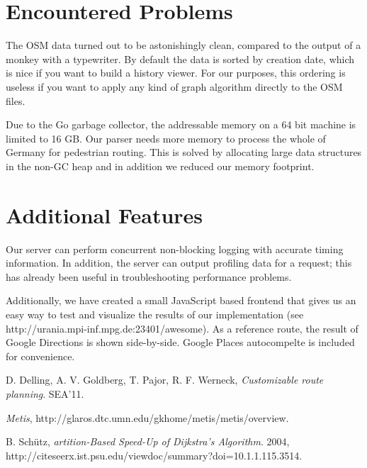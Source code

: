 \documentclass[a4paper]{article}
\begin{document}
\section{Encountered Problems}

The OSM data turned out to be astonishingly clean, compared to the output of a monkey with a typewriter.
By default the data is sorted by creation date, which is nice if you want to build a history viewer.
For our purposes, this ordering is useless if you want to apply any kind of graph algorithm
directly to the OSM files.

Due to the Go garbage collector, the addressable memory on a 64 bit machine is limited to 16 GB.
Our parser needs more memory to process the whole of Germany for pedestrian routing.
This is solved by allocating large data structures in the non-GC heap
and in addition we reduced our memory footprint.

\section{Additional Features}

Our server can perform concurrent non-blocking logging with accurate timing information.
In addition, the server can output profiling data for a request;
this has already been useful in troubleshooting performance problems.

Additionally, we have created a small JavaScript based frontend that 
gives us an easy way to test and visualize the results of our implementation
(see http://urania.mpi-inf.mpg.de:23401/awesome).
As a reference route, the result of Google Directions is shown side-by-side.
Google Places autocompelte is included for convenience.

\begin{thebibliography}{9}
  
	D. Delling, A. V. Goldberg, T. Pajor, R. F. Werneck, \emph{Customizable route planning}. SEA'11. 
	
    \emph{Metis}, http://glaros.dtc.umn.edu/gkhome/metis/metis/overview.

	B. Schütz, \emph{artition-Based Speed-Up of Dijkstra's Algorithm}. 2004, http://citeseerx.ist.psu.edu/viewdoc/summary?doi=10.1.1.115.3514.

\end{thebibliography}
\end{document}

